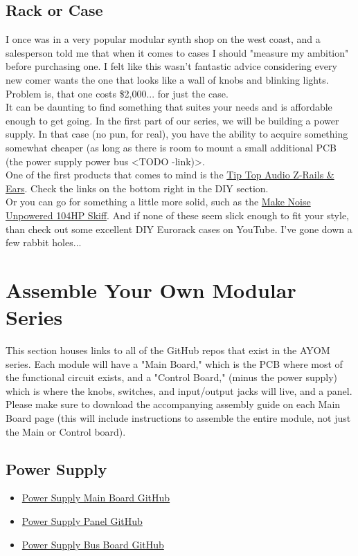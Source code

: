 \documentclass{article}
\begin{document}
\subsection{Rack or Case}
I once was in a very popular modular synth shop on the west coast, and a salesperson told me that when it comes to cases I should "measure my ambition" before purchasing one. I felt like this wasn't fantastic advice considering every new comer wants the one that looks like a wall of knobs and blinking lights. Problem is, that one costs \$2,000... for just the case.\\
\newline
It can be daunting to find something that suites your needs and is affordable enough to get going. In the first part of our series, we will be building a power supply. In that case (no pun, for real), you have the ability to acquire something somewhat cheaper (as long as there is room to mount a small additional PCB (the power supply power bus <TODO -link)>.\\
\newline
One of the first products that comes to mind is the \href{http://tiptopaudio.com/products/}{Tip Top Audio Z-Rails \& Ears}. Check the links on the bottom right in the DIY section.\\
\newline
Or you can go for something a little more solid, such as the \href{https://www.perfectcircuit.com/make-noise-skiff-eurorack-case-104hp.html}{Make Noise Unpowered 104HP Skiff}. And if none of these seem slick enough to fit your style, than check out some excellent DIY Eurorack cases on YouTube. I've gone down a few rabbit holes...

\section{Assemble Your Own Modular Series}
This section houses links to all of the GitHub repos that exist in the AYOM series. Each module will have a "Main Board," which is the PCB where most of the functional circuit exists, and a "Control Board," (minus the power supply) which is where the knobs, switches, and input/output jacks will live, and a panel. Please make sure to download the accompanying assembly guide on each Main Board page (this will include instructions to assemble the entire module, not just the Main or Control board).
\subsection{Power Supply}
\begin{itemize}
	\item \href{https://github.com/joshpanzarella/AYOM-Power-Supply}{Power Supply Main Board GitHub}
	\item \href{https://github.com/joshpanzarella/AYOM-Power-Supply-Panel}{Power Supply Panel GitHub}
	\item \href{https://github.com/joshpanzarella/AYOM-Power-Supply-Bus}{Power Supply Bus Board GitHub}
\end{itemize}
\end{document}
